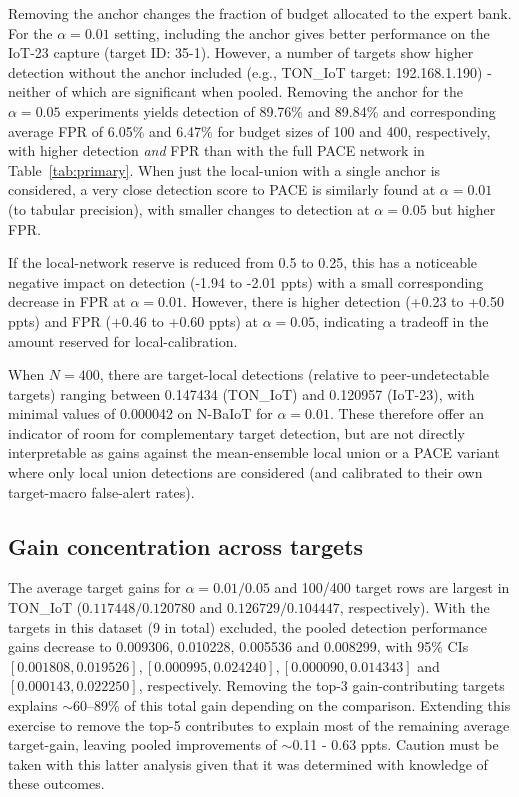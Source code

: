 Removing the anchor changes the fraction of budget allocated to the expert bank. For the $\alpha = 0.01$ setting, including the anchor gives better performance on the IoT-23 capture (target ID: 35-1). However, a number of targets show higher detection without the anchor included (e.g., TON\_IoT target: 192.168.1.190) - neither of which are significant when pooled. Removing the anchor for the $\alpha = 0.05$ experiments yields detection of 89.76\% and 89.84\% and corresponding average FPR of 6.05\% and 6.47\% for budget sizes of 100 and 400, respectively, with higher detection \emph{and} FPR than with the full PACE network in Table~\ref{tab:primary}. When just the local-union with a single anchor is considered, a very close detection score to PACE is similarly found at $\alpha=0.01$ (to tabular precision), with smaller changes to detection at $\alpha = 0.05$ but higher FPR.

If the local-network reserve is reduced from 0.5 to 0.25, this has a noticeable negative impact on detection (-1.94 to -2.01 ppts) with a small corresponding decrease in FPR at $\alpha = 0.01$. However, there is higher detection (+0.23 to +0.50 ppts) and FPR (+0.46 to +0.60 ppts) at $\alpha = 0.05$, indicating a tradeoff in the amount reserved for local-calibration.

When $N = 400$, there are target-local detections (relative to peer-undetectable targets) ranging between 0.147434 (TON\_IoT) and 0.120957 (IoT-23), with minimal values of 0.000042 on N-BaIoT for $\alpha = 0.01$. These therefore offer an indicator of room for complementary target detection, but are not directly interpretable as gains against the mean-ensemble local union or a PACE variant where only local union detections are considered (and calibrated to their own target-macro false-alert rates).

\subsection{Gain concentration across targets} 
The average target gains for $\alpha=0.01/0.05$ and 100/400 target rows are largest in TON\_IoT ($0.117448 / 0.120780$ and $0.126729 / 0.104447$, respectively). With the targets in this dataset (9 in total) excluded, the pooled detection performance gains decrease to 0.009306, 0.010228, 0.005536 and 0.008299, with 95\% CIs $[0.001808, 0.019526], [0.000995, 0.024240], [0.000090, 0.014343]$ and $[0.000143, 0.022250]$, respectively. Removing the top-3 gain-contributing targets explains $\sim$60--89\% of this total gain depending on the comparison. Extending this exercise to remove the top-5 contributes to explain most of the remaining average target-gain, leaving pooled improvements of $\sim$0.11 - 0.63 ppts. Caution must be taken with this latter analysis given that it was determined with knowledge of these outcomes.

